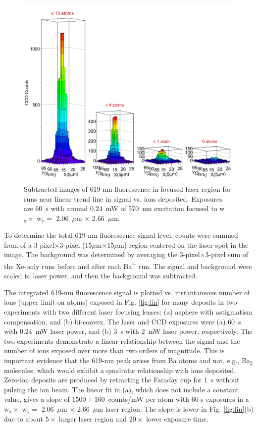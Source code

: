 \begin{figure} %
        \centering
                \includegraphics[width=.99\textwidth]{figures/train.png}
                \caption{Subtracted images of 619-nm fluorescence in focused laser region for runs near linear trend line in signal vs. ions deposited.  Exposures are 60~s with around 0.24~mW of 570~nm excitation focused to w$_{\text{x}} \times$ w$_{\text{y}} =$ 2.06~$\mu$m $\times$ 2.66~$\mu$m.}
\label{fig:train}
\end{figure}

To determine the total 619-nm fluorescence signal level, counts were summed from of a 3-pixel$\times$3-pixel (15$\mu$m$\times$15$\mu$m) region centered on the laser spot in the image.  The background was determined by averaging the 3-pixel$\times$3-pixel sum of the Xe-only runs before and after each Ba\textsuperscript{+} run.  The signal and background were scaled to laser power, and then the background was subtracted.

The integrated 619-nm fluorescence signal is plotted vs. instantaneous number of ions (upper limit on atoms) exposed in Fig. \ref{fig:lin} for many deposits in two experiments with two different laser focusing lenses:  (a) asphere with astigmatism compensation, and (b) bi-convex.  The laser and CCD exposures were (a) 60~s with 0.24~mW laser power, and (b) 3~s with 2~mW laser power, respectively.  The two experiments demonstrate a linear relationship between the signal and the number of ions exposed over more than two orders of magnitude.  This is important evidence that the 619-nm peak arises from Ba atoms and not, e.g., Ba$_{2}$ molecules, which would exhibit a quadratic relationship with ions deposited.  Zero-ion deposits are produced by retracting the Faraday cup for 1~s without pulsing the ion beam.  The linear fit in (a), which does not include a constant value, gives a slope of $1500 \pm 160$~counts/mW per atom with 60-s exposures in a w$_{\text{x}} \times$ w$_{\text{y}} =$ 2.06~$\mu$m $\times$ 2.66~$\mu$m laser region.  The slope is lower in Fig. \ref{fig:lin}(b) due to about $5 \times$ larger laser region and $20 \times$ lower exposure time.%

